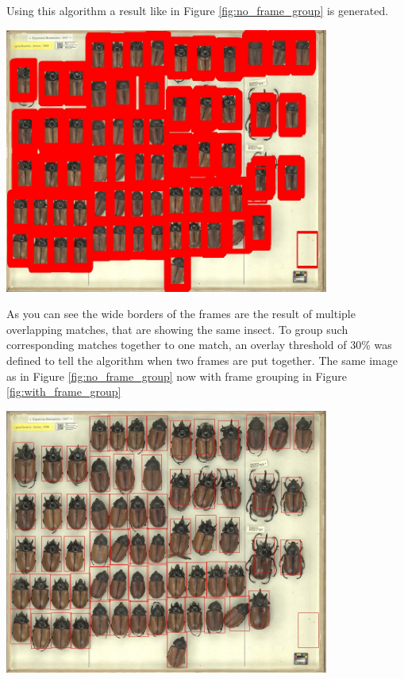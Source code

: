 Using this algorithm a result like in Figure \ref{fig:no_frame_group} is generated.
\begin{center}
	\includegraphics[width=0.8\textwidth]{images/no_frame_group.jpg}
	\label{fig:no_frame_group}
\end{center}

As you can see the wide borders of the frames are the result of multiple overlapping matches, that are showing the same insect.
To group such corresponding matches together to one match, an overlay threshold of 30\% was defined to tell the algorithm when two frames are put together.
The same image as in Figure \ref{fig:no_frame_group} now with frame grouping in Figure \ref{fig:with_frame_group}
\begin{center}
	\includegraphics[width=0.8\textwidth]{images/with_frame_group.jpg}
	\label{fig:with_frame_group}
\end{center}

